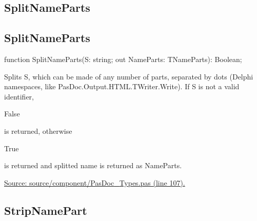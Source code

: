 \documentclass{report}
\newif\ifpdf
\begin{document}
\subsection*{\large{\textbf{SplitNameParts}}\normalsize\hspace{1ex}\hrulefill}
\else
\subsection*{SplitNameParts}
\fi
\label{PasDoc_Types-SplitNameParts}
\begin{list}{}{
\setlength{\itemindent}{0cm}
\setlength{\listparindent}{0cm}
\setlength{\leftmargin}{\evensidemargin}
\addtolength{\leftmargin}{\tmplength}
\settowidth{\labelsep}{X}
\addtolength{\leftmargin}{\labelsep}
\setlength{\labelwidth}{\tmplength}
}
\item[\textbf{Declaration}\hfill]
\ifpdf
\begin{flushleft}
\fi
\begin{ttfamily}
function SplitNameParts(S: string; out NameParts: TNameParts): Boolean;\end{ttfamily}

\ifpdf
\end{flushleft}
\fi

\par
\item[\textbf{Description}]
Splits S, which can be made of any number of parts, separated by dots (Delphi namespaces, like PasDoc.Output.HTML.TWriter.Write). If S is not a valid identifier, \begin{ttfamily}False\end{ttfamily} is returned, otherwise \begin{ttfamily}True\end{ttfamily} is returned and splitted name is returned as NameParts.\par
\href{https://github.com/pasdoc/pasdoc/blob/master/source/component/PasDoc_Types.pas#L107}{Source: source/component/PasDoc{\_}Types.pas (line 107).}

\end{list}
\ifpdf
\subsection*{\large{\textbf{StripNamePart}}\normalsize\hspace{1ex}\hrulefill}
\else
\end{document}
